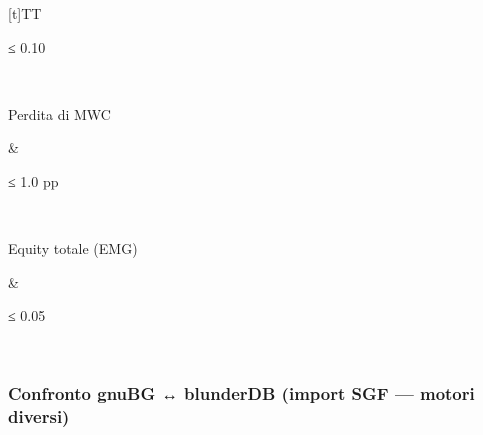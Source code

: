 \documentclass[letterpaper,10pt,italian]{sphinxmanual}
\begin{document}
\begin{savenotes}
\begin{tabulary}{\linewidth}[t]{TT}
\begin{varwidth}[t]{}
\sphinxAtStartPar
≤ 0.10
\sphinxbeforeendvarwidth
\end{varwidth}%
\\
\sphinxhline\begin{varwidth}[t]{}
\sphinxAtStartPar
Perdita di MWC
\sphinxbeforeendvarwidth
\end{varwidth}%
&\begin{varwidth}[t]{}
\sphinxAtStartPar
≤ 1.0 pp
\sphinxbeforeendvarwidth
\end{varwidth}%
\\
\sphinxhline\begin{varwidth}[t]{}
\sphinxAtStartPar
Equity totale (EMG)
\sphinxbeforeendvarwidth
\end{varwidth}%
&\begin{varwidth}[t]{}
\sphinxAtStartPar
≤ 0.05
\sphinxbeforeendvarwidth
\end{varwidth}%
\\
\sphinxbottomrule
\end{tabulary}
\sphinxtableafterendhook\par
\sphinxattableend\end{savenotes}


\subsubsection{Confronto gnuBG ↔ blunderDB (import SGF — motori diversi)}
\label{\detokenize{stats_parity:comparaison-gnubg-blunderdb-import-sgf-moteurs-differents}}
\end{document}
